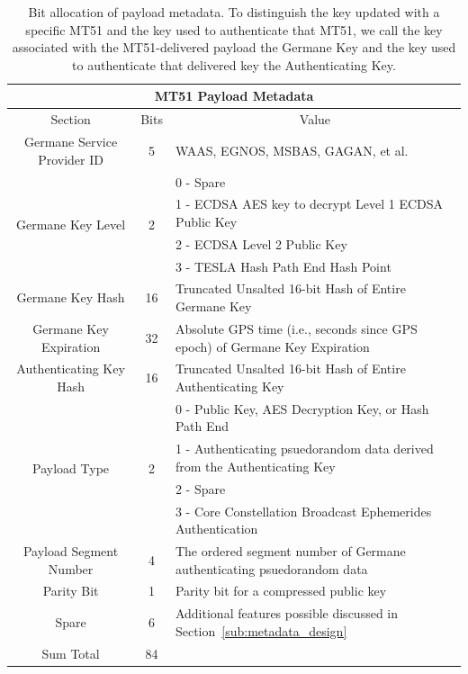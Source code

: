 \documentclass[letterpaper,times]{IONconf/IONconf}
\begin{document}
		\begin{table}%
			\center
			\begin{tabular}{|c|c|l|} \hline
				\multicolumn{3}{|c|}{MT51 Payload Metadata} \\ \hline
				Section & Bits & \multicolumn{1}{|c|}{Value} \\ \hline
				Germane Service Provider ID & 5 & WAAS, EGNOS, MSBAS, GAGAN, et al. \\ \hline
				\multirow{4}{*}{Germane Key Level} & \multirow{4}{*}{2} & 0 - Spare \\ 
				& & 1 - ECDSA AES key to decrypt Level 1 ECDSA Public Key \\
				& & 2 - ECDSA Level 2 Public Key \\
				& & 3 - TESLA Hash Path End Hash Point \\ \hline
				Germane Key Hash & 16 & Truncated Unsalted 16-bit Hash of Entire Germane Key \\ \hline
				Germane Key Expiration & 32 & Absolute GPS time (i.e., seconds since GPS epoch) of Germane Key Expiration \\ \hline
				Authenticating Key Hash & 16 & Truncated Unsalted 16-bit Hash of Entire Authenticating Key \\ \hline
				\multirow{4}{*}{Payload Type} & \multirow{4}{*}{2} & 0 - Public Key, AES Decryption Key, or Hash Path End \\
				& & 1 - Authenticating psuedorandom data derived from the Authenticating Key \\ 
				& & 2 - Spare \\ 
				& & 3 - Core Constellation Broadcast Ephemerides Authentication \\ \hline
				Payload Segment Number & 4 & The ordered segment number of Germane authenticating psuedorandom data \\ \hline
				Parity Bit & 1 & Parity bit for a compressed public key \\ \hline
				Spare & 6 & Additional features possible discussed in Section~\ref{sub:metadata_design} \\ \hline
				Sum Total & 84 & \\ \hline
			\end{tabular}
			\caption{Bit allocation of payload metadata. To distinguish the key updated with a specific MT51 and the key used to authenticate that MT51, we call the key associated with the MT51-delivered payload the Germane Key and the key used to authenticate that delivered key the Authenticating Key.}
			\label{tab: meta-data}
		\end{table}
		
\end{document}
